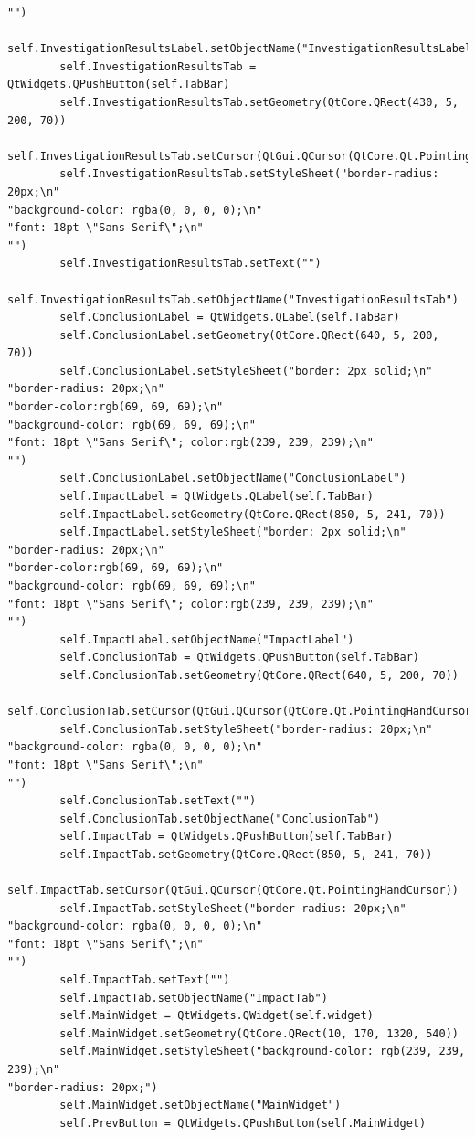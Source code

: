\documentclass[12pt]{article}
\begin{document}
\begin{lstlisting}
"")
        self.InvestigationResultsLabel.setObjectName("InvestigationResultsLabel")
        self.InvestigationResultsTab = QtWidgets.QPushButton(self.TabBar)
        self.InvestigationResultsTab.setGeometry(QtCore.QRect(430, 5, 200, 70))
        self.InvestigationResultsTab.setCursor(QtGui.QCursor(QtCore.Qt.PointingHandCursor))
        self.InvestigationResultsTab.setStyleSheet("border-radius: 20px;\n"
"background-color: rgba(0, 0, 0, 0);\n"
"font: 18pt \"Sans Serif\";\n"
"")
        self.InvestigationResultsTab.setText("")
        self.InvestigationResultsTab.setObjectName("InvestigationResultsTab")
        self.ConclusionLabel = QtWidgets.QLabel(self.TabBar)
        self.ConclusionLabel.setGeometry(QtCore.QRect(640, 5, 200, 70))
        self.ConclusionLabel.setStyleSheet("border: 2px solid;\n"
"border-radius: 20px;\n"
"border-color:rgb(69, 69, 69);\n"
"background-color: rgb(69, 69, 69);\n"
"font: 18pt \"Sans Serif\"; color:rgb(239, 239, 239);\n"
"")
        self.ConclusionLabel.setObjectName("ConclusionLabel")
        self.ImpactLabel = QtWidgets.QLabel(self.TabBar)
        self.ImpactLabel.setGeometry(QtCore.QRect(850, 5, 241, 70))
        self.ImpactLabel.setStyleSheet("border: 2px solid;\n"
"border-radius: 20px;\n"
"border-color:rgb(69, 69, 69);\n"
"background-color: rgb(69, 69, 69);\n"
"font: 18pt \"Sans Serif\"; color:rgb(239, 239, 239);\n"
"")
        self.ImpactLabel.setObjectName("ImpactLabel")
        self.ConclusionTab = QtWidgets.QPushButton(self.TabBar)
        self.ConclusionTab.setGeometry(QtCore.QRect(640, 5, 200, 70))
        self.ConclusionTab.setCursor(QtGui.QCursor(QtCore.Qt.PointingHandCursor))
        self.ConclusionTab.setStyleSheet("border-radius: 20px;\n"
"background-color: rgba(0, 0, 0, 0);\n"
"font: 18pt \"Sans Serif\";\n"
"")
        self.ConclusionTab.setText("")
        self.ConclusionTab.setObjectName("ConclusionTab")
        self.ImpactTab = QtWidgets.QPushButton(self.TabBar)
        self.ImpactTab.setGeometry(QtCore.QRect(850, 5, 241, 70))
        self.ImpactTab.setCursor(QtGui.QCursor(QtCore.Qt.PointingHandCursor))
        self.ImpactTab.setStyleSheet("border-radius: 20px;\n"
"background-color: rgba(0, 0, 0, 0);\n"
"font: 18pt \"Sans Serif\";\n"
"")
        self.ImpactTab.setText("")
        self.ImpactTab.setObjectName("ImpactTab")
        self.MainWidget = QtWidgets.QWidget(self.widget)
        self.MainWidget.setGeometry(QtCore.QRect(10, 170, 1320, 540))
        self.MainWidget.setStyleSheet("background-color: rgb(239, 239, 239);\n"
"border-radius: 20px;")
        self.MainWidget.setObjectName("MainWidget")
        self.PrevButton = QtWidgets.QPushButton(self.MainWidget)

\end{lstlisting}
\end{document}
